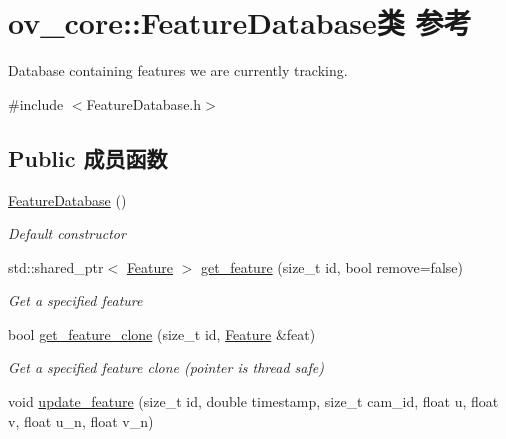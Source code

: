 \hypertarget{classov__core_1_1FeatureDatabase}{}\section{ov\+\_\+core\+:\+:Feature\+Database类 参考}
\label{classov__core_1_1FeatureDatabase}


Database containing features we are currently tracking.  




{\ttfamily \#include $<$Feature\+Database.\+h$>$}

\subsection*{Public 成员函数}
\begin{DoxyCompactItemize}
\item 
\mbox{\label{classov__core_1_1FeatureDatabase_a26d81dfa410ec463172796cc9ae8cafd}} 
\hyperlink{classov__core_1_1FeatureDatabase_a26d81dfa410ec463172796cc9ae8cafd}{Feature\+Database} ()
\begin{DoxyCompactList}\small\item\em Default constructor \end{DoxyCompactList}\item 
std\+::shared\+\_\+ptr$<$ \hyperlink{classov__core_1_1Feature}{Feature} $>$ \hyperlink{classov__core_1_1FeatureDatabase_a3c7b5ef425c785eb3c160e995c545f87}{get\+\_\+feature} (size\+\_\+t id, bool remove=false)
\begin{DoxyCompactList}\small\item\em Get a specified feature \end{DoxyCompactList}\item 
bool \hyperlink{classov__core_1_1FeatureDatabase_a98e2d5320881107343b07f79cac8b541}{get\+\_\+feature\+\_\+clone} (size\+\_\+t id, \hyperlink{classov__core_1_1Feature}{Feature} \&feat)
\begin{DoxyCompactList}\small\item\em Get a specified feature clone (pointer is thread safe) \end{DoxyCompactList}\item 
void \hyperlink{classov__core_1_1FeatureDatabase_adf78008573a5aebe8a89cddbaf4b5b01}{update\+\_\+feature} (size\+\_\+t id, double timestamp, size\+\_\+t cam\+\_\+id, float u, float v, float u\+\_\+n, float v\+\_\+n)

\end{DoxyCompactItemize}
